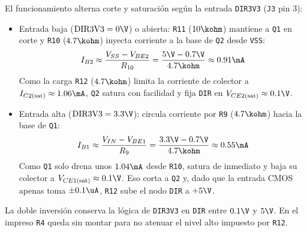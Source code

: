 El funcionamiento alterna corte y saturación según la entrada \texttt{DIR3V3} (\texttt{J3} pin 3):

\begin{itemize}
  \item Entrada baja ($\text{DIR3V3} = 0\V$) o abierta: \texttt{R11} ($10\kohm$) mantiene a \texttt{Q1} en corte y
    \texttt{R10} ($4.7\kohm$) inyecta corriente a la base de \texttt{Q2} desde \texttt{VSS}:
    \begin{equation*}
      I_{B2} \approx \frac{V_{SS} - V_{BE2}}{R_{10}} = \frac{5\V - 0.7\V}{4.7\kohm} \approx 0.91\mA
    \end{equation*}
    Como la carga \texttt{R12} ($4.7\kohm$) limita la corriente de colector a $I_{C2(\text{sat})} \approx 1.06\mA$,
    \texttt{Q2} satura con facilidad y fija \texttt{DIR} en $V_{CE2(\text{sat})} \approx 0.1\V$.
  \item Entrada alta ($\text{DIR3V3} = 3.3\V$): circula corriente por \texttt{R9} ($4.7\kohm$) hacia la base de
    \texttt{Q1}:
    \begin{equation*}
      I_{B1} \approx \frac{V_{IN} - V_{BE1}}{R_9} = \frac{3.3\V - 0.7\V}{4.7\kohm} \approx 0.55\mA
    \end{equation*}
    Como \texttt{Q1} solo drena unos $1.04\mA$ desde \texttt{R10}, satura de inmediato y baja su colector a
    $V_{CE1(\text{sat})} \approx 0.1\V$. Eso corta a \texttt{Q2} y, dado que la entrada CMOS apenas toma
    $\pm 0.1\uA$, \texttt{R12} sube el nodo \texttt{DIR} a $+5\V$.
\end{itemize}

La doble inversión conserva la lógica de \texttt{DIR3V3} en \texttt{DIR} entre $0.1\V$ y $5\V$. En el impreso
\texttt{R4} queda sin montar para no atenuar el nivel alto impuesto por \texttt{R12}.
